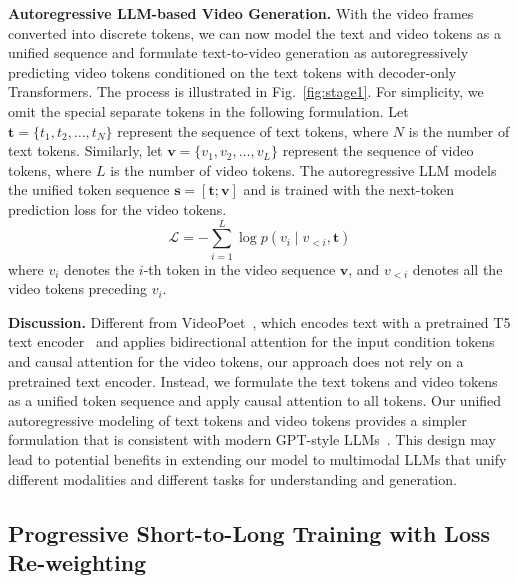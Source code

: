 \textbf{Autoregressive LLM-based Video Generation.}
With the video frames converted into discrete tokens, we can now model the text and video tokens as a unified sequence and formulate text-to-video generation as autoregressively predicting video tokens conditioned on the text tokens with decoder-only Transformers. The process is illustrated in Fig.~\ref{fig:stage1}. For simplicity, we omit the special separate tokens in the following formulation.
Let $\mathbf{t} = \{t_1, t_2, \ldots, t_N\}$ represent the sequence of text tokens, where $N$ is the number of text tokens. Similarly, let $\mathbf{v} = \{v_1, v_2, \ldots, v_L\}$ represent the sequence of video tokens, where $L$ is the number of video tokens.
The autoregressive LLM models the unified token sequence $\mathbf{s} = [\mathbf{t}; \mathbf{v}]$ and is trained with the next-token prediction loss for the video tokens.
\begin{equation}
\mathcal{L} = -\sum_{i=1}^{L} \log p(v_i \mid v_{<i}, \mathbf{t})
\end{equation}
where $v_i$ denotes the $i$-th token in the video sequence $\mathbf{v}$, and $v_{<i}$ denotes all the video tokens preceding $v_i$. 


\textbf{Discussion.}
Different from 
VideoPoet~\cite{kondratyuk2023videopoet}, which encodes text with a pretrained T5 text encoder~\cite{2020t5} and applies bidirectional attention for the input condition tokens and causal attention for the video tokens, our approach does not rely on a pretrained text encoder. Instead, we formulate the text tokens and video tokens as a unified token sequence and apply causal attention to all tokens.
Our unified autoregressive modeling of text tokens and video tokens provides a simpler formulation that is consistent with modern GPT-style LLMs~\cite{gpt3}. This design may lead to potential benefits in extending our model to multimodal LLMs that unify different modalities and different tasks for understanding and generation.


\subsection{Progressive Short-to-Long Training with Loss Re-weighting}
\label{sec:3.2}


